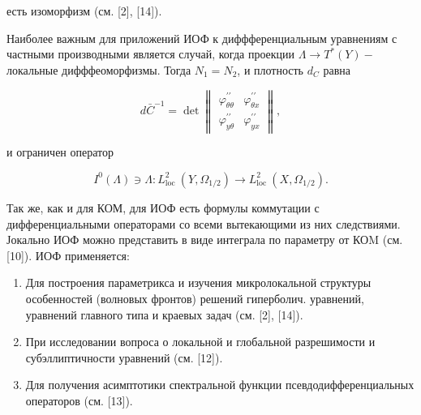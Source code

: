 \documentclass[10pt]{article}
\begin{document}
есть изоморфизм (см. [2], [14]).



Наиболее важным для приложений ИОФ к диффференциальным уравнениям с частными производными является случай, когда проекции $\Lambda \rightarrow T^{*}(Y)-$ локальные дифффеоморфизмы. Тогда $N_{1}=N_{2}$, и плотность $d_{C}$ равна



\[

d \bar{C}^{-1}=\operatorname{det}\left\|\begin{array}{ll}

\varphi_{\theta \theta}^{\prime \prime} & \varphi_{\theta x}^{\prime \prime} \\

\varphi_{y \theta}^{\prime \prime} & \varphi_{y x}^{\prime \prime}

\end{array}\right\|,

\]



и ограничен оператор



\[

I^{0}(\Lambda) \ni \Lambda: L_{\text {loc }}^{2}\left(Y, \Omega_{1 / 2}\right) \rightarrow L_{\text {loc }}^{2}\left(X, \Omega_{1 / 2}\right) .

\]



Так же, как и для КОМ, для ИОФ есть формулы коммутации с дифференциальными операторами со всеми вытекающими из них следствиями. Јокально ИОФ можно представить в виде интеграла по параметру от КОM (см. [10]). ИОФ применяется:



\begin{enumerate}

  \item Для построения параметрикса и изучения микролокальной структуры особенностей (волновых фронтов) решений гиперболич. уравнений, уравнений главного типа и краевых задач (см. [2], [14]).



  \item При исследовании вопроса о локальной и глобальной разрешимости и субэллиптичности уравнений (см. [12]).



  \item Для получения асимптотики спектральной функции псевдодифференциальных операторов (см. [13]).



\end{enumerate}
\end{document}

